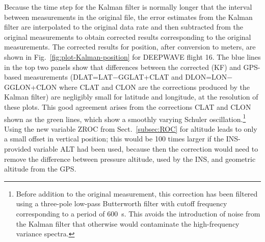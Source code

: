 \documentclass[12pt,twoside,english,12pt,twoside,english]{article}\usepackage[]{graphicx}\usepackage[]{color}
\let\OrgIndex\index
\renewcommand*{\index}[1]{\OrgIndex{#1}}
\begin{document}
Because the time step for the Kalman
filter is normally longer that the interval between measurements in
the original file, the error estimates from the Kalman filter are
interpolated to the original
data rate and then subtracted from the original
measurements to obtain corrected
results corresponding to the original measurements. The corrected
results for position, after conversion to meters, are shown in Fig.~\ref{fig:plot-Kalman-position}
for DEEPWAVE flight 16. The blue
lines in the top two panels show that differences between the corrected
(KF) and GPS-based measurements (DLAT=LAT$-$GGLAT+CLAT
and DLON=LON$-$GGLON+CLON
where CLAT and CLON are the corrections produced by the Kalman filter)
are negligibly small for latitude and longitude,
at the resolution of these plots. This good agreement arises from
the corrections CLAT and CLON shown as the green lines, which show
a smoothly varying Schuler oscillation.\footnote{Before addition to the original measurement, this correction has been
filtered using a three-pole low-pass Butterworth filter
 with cutoff frequency corresponding
to a period of 600~s. This avoids the introduction of noise from
the Kalman filter that otherwise would contaminate the high-frequency
variance spectra.} Using the new variable ZROC
from Sect.~\ref{subsec:ROC} for altitude
leads to only a small offset in vertical position;
this would be 100 times larger if the INS-provided
variable ALT
 had been used, because then the correction would need to remove the
difference between pressure altitude,
used by the INS, and geometric altitude
 from the GPS. 
\end{document}
